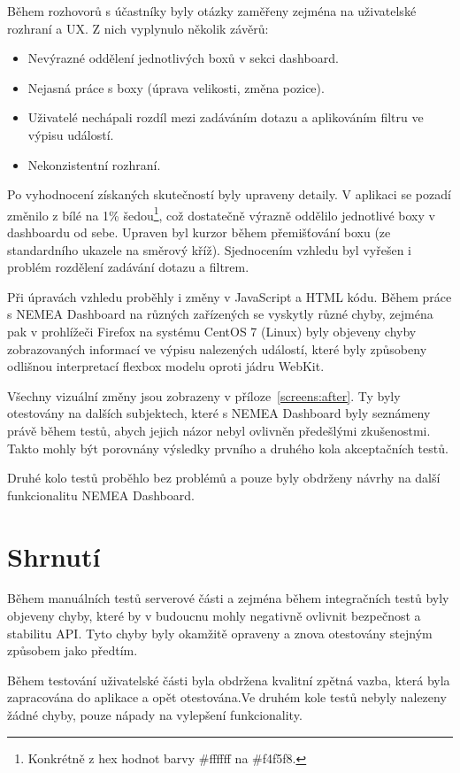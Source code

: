Během rozhovorů s účastníky byly otázky zaměřeny zejména na uživatelské rozhraní a UX. Z nich vyplynulo několik závěrů:

\begin{itemize}
    \item Nevýrazné oddělení jednotlivých boxů v sekci dashboard.
    \item Nejasná práce s boxy (úprava velikosti, změna pozice).
    \item Uživatelé nechápali rozdíl mezi zadáváním dotazu a aplikováním filtru ve výpisu událostí.
    \item Nekonzistentní rozhraní.
\end{itemize}

Po vyhodnocení získaných skutečností byly upraveny detaily. V aplikaci se pozadí změnilo z bílé na 1\% šedou\footnote{Konkrétně z hex hodnot barvy \#ffffff na \#f4f5f8.}, což dostatečně výrazně oddělilo jednotlivé boxy v dashboardu od sebe. Upraven byl kurzor během přemišťování boxu (ze standardního ukazele na směrový kříž). Sjednocením vzhledu byl vyřešen i problém rozdělení zadávání dotazu a filtrem.

Při úpravách vzhledu proběhly i změny v JavaScript a HTML kódu. Během práce s NEMEA Dashboard na různých zařízených se vyskytly různé chyby, zejména pak v prohlížeči Firefox na systému CentOS 7 (Linux) byly objeveny chyby zobrazovaných informací ve výpisu nalezených událostí, které byly způsobeny odlišnou interpretací flexbox modelu oproti jádru WebKit. 

Všechny vizuální změny jsou zobrazeny v příloze~\ref{screens:after}. Ty byly otestovány na dalších subjektech, které s NEMEA Dashboard byly seznámeny právě během testů, abych jejich názor nebyl ovlivněn předešlými zkušenostmi. Takto mohly být porovnány výsledky prvního a druhého kola akceptačních testů.

Druhé kolo testů proběhlo bez problémů a pouze byly obdrženy návrhy na další funkcionalitu NEMEA Dashboard.

\section{Shrnutí}

Během manuálních testů serverové části a zejména během integračních testů byly objeveny chyby, které by v budoucnu mohly negativně ovlivnit bezpečnost a stabilitu API. Tyto chyby byly okamžitě opraveny a znova otestovány stejným způsobem jako předtím. 

Během testování uživatelské části byla obdržena kvalitní zpětná vazba, která byla zapracována do aplikace a opět otestována.Ve druhém kole testů nebyly nalezeny žádné chyby, pouze nápady na vylepšení funkcionality.  

